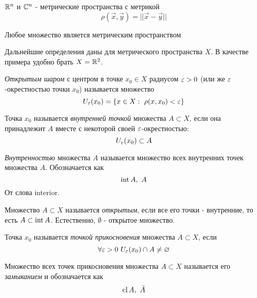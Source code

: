 \begin{multicols}{2}
    
    \cons
        $\mathbb{R}^n$ и $\mathbb{C}^n$ - метрические пространства с метрикой
        \[
        \rho(\vec{x}, \vec{y}) = ||\vec{x} - \vec{y}||
        \]
    
    
    \begin{proposition}{}{}
        Любое множество является метрическим пространством
    \end{proposition}
    
    
    \begin{note}{}{}
        Дальнейшие определения даны для метрического пространства $X$. В качестве примера удобно брать $X = \mathbb{R}^2$.
    \end{note}
    
    \begin{definition}{}{}
        \textit{Открытым шаром} с центром в точке $x_0 \in X$ радиусом $\varepsilon > 0$ (или же $\varepsilon$-окрестностью точки $x_0$) называется множество
        \[
            U_\varepsilon(x_0) = \{x \in X : \  \rho(x, x_0) < \varepsilon\}
        \]
    \end{definition}
    
    \begin{definition}{}{}
        Точка $x_0$ называется \textit{внутренней точкой} множества $A \subset X$, если она принадлежит $A$ вместе с некоторой своей $\varepsilon$-окрестностью:
        \[
            U_\varepsilon(x_0) \subset A
        \]
    \end{definition}
    \begin{definition}{}{}
        \textit{Внутренностью} множества $A$ называется множество всех внутренних точек множества $A$. Обозначается как
        \[
            \operatorname{int} A,\ A
        \]
        От слова interior.
    \end{definition}
    
    \begin{definition}{}{}
        Множество $A \subset X$ называется \textit{открытым}, если все его точки - внутренние, то есть $A \subset \operatorname{int} A$. Естественно, $\emptyset$ - открытое множество.
    \end{definition}
    
    \begin{definition}{}{}
        Точка $x_0$ называется \textit{точкой прикосновения} множества $A \subset X$, если
        \[
            \forall \varepsilon > 0\ U_\varepsilon(x_0) \cap A \neq \varnothing
        \]
    \end{definition}
    
    \begin{definition}{}{}
        Множество всех точек прикосновения множества $A \subset X$ называется его \textit{замыканием} и обозначается как
        \[
            \operatorname{cl} A,\ \bar{A}
        \]
    \end{definition}
    

\end{multicols}
